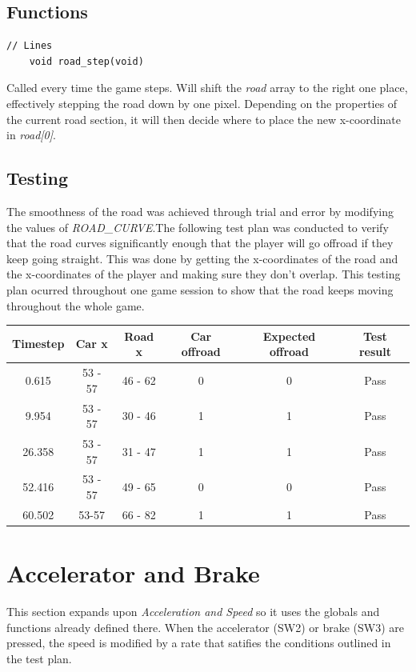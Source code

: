 \documentclass{article}
\begin{document}
\subsection*{Functions}
\begin{lstlisting}[style=CStyle]
	// Lines
	void road_step(void)
\end{lstlisting}
Called every time the game steps. Will shift the \emph{road} array to the right one place, effectively stepping the road down by one pixel. Depending on the properties of the current road section, it will then decide where to place the new x-coordinate in \emph{road[0]}.
\newline

\subsection*{Testing}
The smoothness of the road was achieved through trial and error by modifying the values of \emph{ROAD\_CURVE}.The following test plan was conducted to verify that the road curves significantly enough that the player will go offroad if they keep going straight. This was done by getting the x-coordinates of the road and the x-coordinates of the player and making sure they don't overlap.
\newline
This testing plan ocurred throughout one game session to show that the road keeps moving throughout the whole game.
\begin{center}
\begin{tabular}{ c c c c c c }
Timestep	& Car x 	& Road x 	& Car offroad	& Expected offroad		& Test result		\\ \hline
0.615		& 53 - 57	& 46 - 62	& 0			& 0				& Pass		\\
9.954		& 53 - 57	& 30 - 46	& 1			& 1				& Pass		\\
26.358	& 53 - 57	& 31 - 47	& 1			& 1				& Pass		\\
52.416	& 53 - 57	& 49 - 65	& 0			& 0 				& Pass		\\
60.502	& 53-57	& 66 - 82	& 1			& 1				& Pass		\\ \hline
\end{tabular}
\end{center}


\clearpage

\section{Accelerator and Brake}
This section expands upon \emph{Acceleration and Speed} so it uses the globals and functions already defined there. When the accelerator (SW2) or brake (SW3) are pressed, the speed is modified by a rate that satifies the conditions outlined in the test plan.
 
\end{document}
